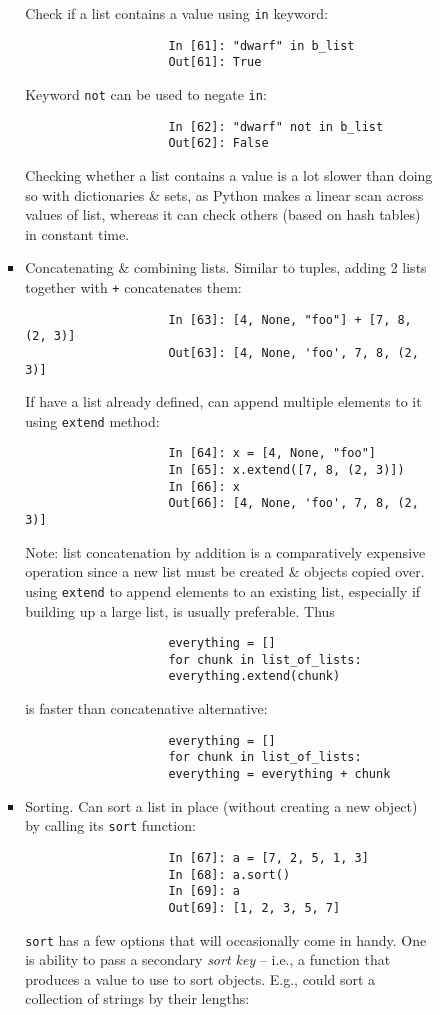 \documentclass{article}
\begin{document}
\begin{itemize}
\begin{itemize}
\begin{itemize}
\begin{itemize}
				Check if a list contains a value using {\tt in} keyword:
				\begin{verbatim}
					In [61]: "dwarf" in b_list
					Out[61]: True
				\end{verbatim}
				Keyword {\tt not} can be used to negate {\tt in}:
				\begin{verbatim}
					In [62]: "dwarf" not in b_list
					Out[62]: False
				\end{verbatim}
				Checking whether a list contains a value is a lot slower than doing so with dictionaries \& sets, as Python makes a linear scan across values of list, whereas it can check others (based on hash tables) in constant time.
				\item {\sf Concatenating \& combining lists.} Similar to tuples, adding 2 lists together with {\tt+} concatenates them:
				\begin{verbatim}
					In [63]: [4, None, "foo"] + [7, 8, (2, 3)]
					Out[63]: [4, None, 'foo', 7, 8, (2, 3)]
				\end{verbatim}
				If have a list already defined, can append multiple elements to it using {\tt extend} method:
				\begin{verbatim}
					In [64]: x = [4, None, "foo"]
					In [65]: x.extend([7, 8, (2, 3)])
					In [66]: x
					Out[66]: [4, None, 'foo', 7, 8, (2, 3)]
				\end{verbatim}
				Note: list concatenation by addition is a comparatively expensive operation since a new list must be created \& objects copied over. using {\tt extend} to append elements to an existing list, especially if building up a large list, is usually preferable. Thus
				\begin{verbatim}
					everything = []
					for chunk in list_of_lists:
					everything.extend(chunk)
				\end{verbatim}
				is faster than concatenative alternative:
				\begin{verbatim}
					everything = []
					for chunk in list_of_lists:
					everything = everything + chunk
				\end{verbatim}
				\item {\sf Sorting.} Can sort a list in place (without creating a new object) by calling its {\tt sort} function:
				\begin{verbatim}
					In [67]: a = [7, 2, 5, 1, 3]
					In [68]: a.sort()
					In [69]: a
					Out[69]: [1, 2, 3, 5, 7]
				\end{verbatim}
				{\tt sort} has a few options that will occasionally come in handy. One is ability to pass a secondary {\it sort key} -- i.e., a function that produces a value to use to sort objects. E.g., could sort a collection of strings by their lengths:

\end{itemize}
\end{itemize}
\end{itemize}
\end{itemize}
\end{document}
